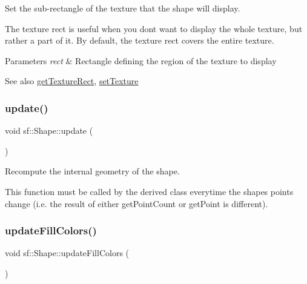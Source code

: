 Set the sub-\/rectangle of the texture that the shape will display. 

The texture rect is useful when you don\textquotesingle{}t want to display the whole texture, but rather a part of it. By default, the texture rect covers the entire texture.


\begin{DoxyParams}{Parameters}
{\em rect} & Rectangle defining the region of the texture to display\\
\hline
\end{DoxyParams}
\begin{DoxySeeAlso}{See also}
\mbox{\hyperlink{classsf_1_1_shape_ac878aab03c230dc31c44e250d092b9ea}{get\+Texture\+Rect}}, \mbox{\hyperlink{classsf_1_1_shape_af8fb22bab1956325be5d62282711e3b6}{set\+Texture}} \begin{DoxyVerb}\end{DoxyVerb}
 
\end{DoxySeeAlso}
\mbox{\label{classsf_1_1_shape_adfb2bd966c8edbc5d6c92ebc375e4ac1}} 
\subsubsection{\texorpdfstring{update()}{update()}}
{\footnotesize\ttfamily void sf\+::\+Shape\+::update (\begin{DoxyParamCaption}{ }\end{DoxyParamCaption})\hspace{0.3cm}{\ttfamily [protected]}}



Recompute the internal geometry of the shape. 

This function must be called by the derived class everytime the shape\textquotesingle{}s points change (i.\+e. the result of either get\+Point\+Count or get\+Point is different). \begin{DoxyVerb}\end{DoxyVerb}
 \mbox{\label{classsf_1_1_shape_a371b37d672f96660dcf70aa06b2fab77}} 
\subsubsection{\texorpdfstring{updateFillColors()}{updateFillColors()}}
{\footnotesize\ttfamily void sf\+::\+Shape\+::update\+Fill\+Colors (\begin{DoxyParamCaption}{ }\end{DoxyParamCaption})\hspace{0.3cm}{\ttfamily [private]}}



